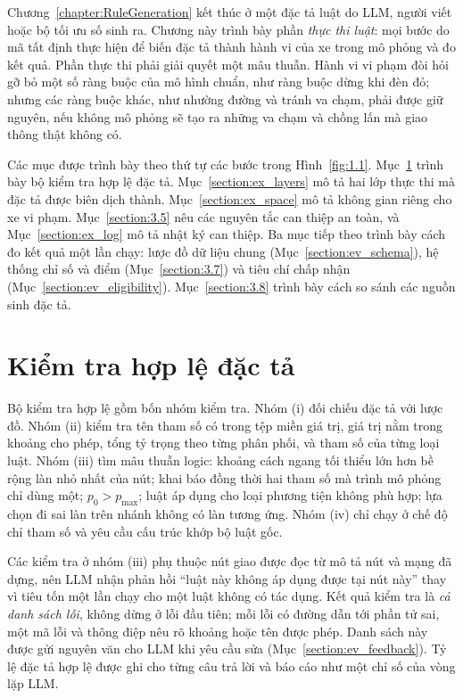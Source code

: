 \documentclass[../main.tex]{subfiles}
\begin{document}

Chương~\ref{chapter:RuleGeneration} kết thúc ở một đặc tả luật do LLM, người viết hoặc bộ tối ưu số sinh ra. Chương này trình bày phần \emph{thực thi luật}: mọi bước do mã tất định thực hiện để biến đặc tả thành hành vi của xe trong mô phỏng và đo kết quả. Phần thực thi phải giải quyết một mâu thuẫn. Hành vi vi phạm đòi hỏi gỡ bỏ một số ràng buộc của mô hình chuẩn, như ràng buộc dừng khi đèn đỏ; nhưng các ràng buộc khác, như nhường đường và tránh va chạm, phải được giữ nguyên, nếu không mô phỏng sẽ tạo ra những va chạm và chồng lấn mà giao thông thật không có.

Các mục được trình bày theo thứ tự các bước trong Hình~\ref{fig:1.1}. Mục~\ref{section:3.4} trình bày bộ kiểm tra hợp lệ đặc tả. Mục~\ref{section:ex_layers} mô tả hai lớp thực thi mà đặc tả được biên dịch thành. Mục~\ref{section:ex_space} mô tả không gian riêng cho xe vi phạm. Mục~\ref{section:3.5} nêu các nguyên tắc can thiệp an toàn, và Mục~\ref{section:ex_log} mô tả nhật ký can thiệp. Ba mục tiếp theo trình bày cách đo kết quả một lần chạy: lược đồ dữ liệu chung (Mục~\ref{section:ev_schema}), hệ thống chỉ số và điểm (Mục~\ref{section:3.7}) và tiêu chí chấp nhận (Mục~\ref{section:ev_eligibility}). Mục~\ref{section:3.8} trình bày cách so sánh các nguồn sinh đặc tả.

\section{Kiểm tra hợp lệ đặc tả}
\label{section:3.4}

Bộ kiểm tra hợp lệ gồm bốn nhóm kiểm tra. Nhóm (i) đối chiếu đặc tả với lược đồ. Nhóm (ii) kiểm tra tên tham số có trong tệp miền giá trị, giá trị nằm trong khoảng cho phép, tổng tỷ trọng theo từng phân phối, và tham số của từng loại luật. Nhóm (iii) tìm mâu thuẫn logic: khoảng cách ngang tối thiểu lớn hơn bề rộng làn nhỏ nhất của nút; khai báo đồng thời hai tham số mà trình mô phỏng chỉ dùng một; $p_0 > p_{\max}$; luật áp dụng cho loại phương tiện không phù hợp; lựa chọn đi sai làn trên nhánh không có làn tương ứng. Nhóm (iv) chỉ chạy ở chế độ chỉ tham số và yêu cầu cấu trúc khớp bộ luật gốc.

Các kiểm tra ở nhóm (iii) phụ thuộc nút giao được đọc từ mô tả nút và mạng đã dựng, nên LLM nhận phản hồi ``luật này không áp dụng được tại nút này'' thay vì tiêu tốn một lần chạy cho một luật không có tác dụng. Kết quả kiểm tra là \emph{cả danh sách lỗi}, không dừng ở lỗi đầu tiên; mỗi lỗi có đường dẫn tới phần tử sai, một mã lỗi và thông điệp nêu rõ khoảng hoặc tên được phép. Danh sách này được gửi nguyên văn cho LLM khi yêu cầu sửa (Mục~\ref{section:ev_feedback}). Tỷ lệ đặc tả hợp lệ được ghi cho từng câu trả lời và báo cáo như một chỉ số của vòng lặp LLM.
\end{document}
